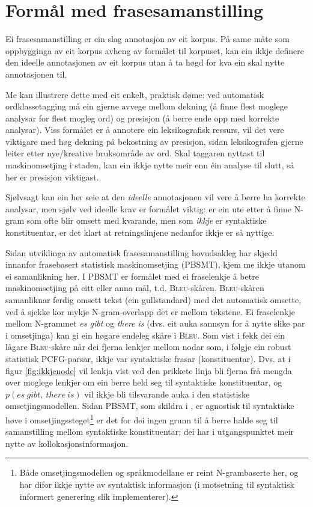 \documentclass[11pt,a4paper,oneside,draft]{book}
\newcommand{\Bleu}{\textsc{Bleu}}
\begin{document}
\section{Formål med frasesamanstilling}
\label{sec-3.2}

\label{SEC:formaal}

Ei frasesamanstilling er ein slag annotasjon av eit korpus. På same
måte som oppbygginga av eit korpus avheng av formålet til korpuset,
kan ein ikkje definere den ideelle annotasjonen av eit korpus utan å
ta høgd for kva ein skal nytte annotasjonen til.

Me kan illustrere dette med eit enkelt, praktisk døme: ved automatisk
ordklassetagging må ein gjerne avvege mellom dekning (å finne flest
moglege analysar for flest mogleg ord) og presisjon (å berre ende opp
med korrekte analysar).  Viss formålet er å annotere ein
leksikografisk ressurs, vil det vere viktigare med høg dekning på
bekostning av presisjon, sidan leksikografen gjerne leiter etter
nye/kreative bruksområde av ord. Skal taggaren nyttast til
maskinomsetjing i staden, kan ein ikkje nytte meir enn éin analyse til
slutt, så her er presisjon viktigast.

Sjølvsagt kan ein her seie at den \emph{ideelle} annotasjonen vil vere å
berre ha korrekte analysar, men sjølv ved ideelle krav er formålet
viktig: er ein ute etter å finne N-gram som ofte blir omsett med
kvarande, men som \emph{ikkje} er syntaktiske konstituentar, er det klart
at retningslinjene nedanfor ikkje er så nyttige.

Sidan utviklinga av automatisk frasesamanstilling hovudsakleg har
skjedd innanfor frasebasert statistisk maskinomsetjing (PBSMT), kjem
me ikkje utanom ei samanlikning her. I PBSMT er formålet med ei
fraselenkje å betre maskinomsetjing på eitt eller anna mål,
t.d. \Bleu-skåren. \Bleu-skåren samanliknar ferdig omsett tekst (ein
gullstandard) med det automatisk omsette, ved å sjekke kor mykje
N-gram-overlapp det er mellom tekstene. Ei fraselenkje mellom
N-grammet \emph{es gibt} og \emph{there is} (dvs. eit auka sannsyn for å nytte
slike par i omsetjinga) kan gi ein høgare endeleg skåre i \Bleu. Som
vist i \citet{koehn2003spb} fekk dei ein lågare \Bleu-skåre når dei
  fjerna lenkjer mellom nodar som, i følgje ein robust
statistisk PCFG-parsar, ikkje var syntaktiske frasar
(konstituentar). Dvs. at i figur \ref{fig:ikkjenode} vil lenkja vist
ved den prikkete linja bli fjerna frå mengda over moglege lenkjer om
ein berre held seg til syntaktiske konstituentar, og
$p(es~gibt,~there~is)$ vil ikkje bli tilsvarande auka i den
statistiske omsetjingsmodellen. Sidan PBSMT, som skildra i
\citet{koehn2003spb}, er agnostisk til syntaktiske høve i
omsetjingssteget\footnote{Både omsetjingsmodellen og språkmodellane er reint
      N-grambaserte her, og har difor ikkje nytte av syntaktisk
      informasjon (i motsetning til syntaktisk informert generering
      slik \citet{riezler2006gmt} implementerer). } er det for dei ingen grunn til å berre halde
seg til samanstilling mellom syntaktiske konstituentar; dei har i
utgangspunktet meir nytte av kollokasjonsinformasjon.
\end{document}
